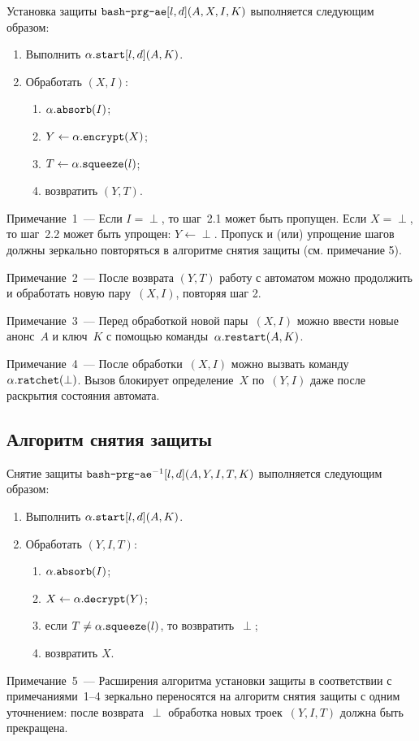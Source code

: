 Установка защиты $\texttt{bash-prg-ae}[l,d](A,X,I,K)$ выполняется следующим образом:
\begin{enumerate}
\item
Выполнить $\alpha.\texttt{start}[l,d](A,K)$.
\item
Обработать $(X,I)$:
\begin{enumerate}
\item
$\alpha.\texttt{absorb}(I)$;
\item
$Y\leftarrow\alpha.\texttt{encrypt}(X)$;
\item
$T\leftarrow \alpha.\texttt{squeeze}(l)$;
\item
возвратить $(Y,T)$.
\end{enumerate}
\end{enumerate}

\begin{note}
Примечание~1~--- 
Если $I=\perp$, то шаг~2.1 может быть пропущен.
%
Если $X=\perp$, то шаг~2.2 может быть упрощен: $Y\leftarrow\perp$.
%
Пропуск и (или) упрощение шагов должны зеркально повторяться в алгоритме снятия 
защиты (см. примечание 5).
\end{note}

\begin{note}
Примечание~2~--- После возврата $(Y,T)$ работу с автоматом
можно продолжить и обработать новую пару~$(X,I)$, повторяя шаг 2.
\end{note}

\begin{note}
Примечание~3~--- Перед обработкой новой пары~$(X,I)$ можно ввести
новые анонс~$A$ и ключ~$K$ с помощью 
команды~$\alpha.\texttt{restart}(A, K)$.
\end{note}

\begin{note}
Примечание~4~--- 
После обработки~$(X,I)$ можно вызвать 
команду~$\alpha.\texttt{ratchet}(\perp)$. Вызов блокирует  
определение~$X$ по~$(Y,I)$ даже после раскрытия состояния автомата. 
\end{note}

\subsection{Алгоритм снятия защиты}\label{PRG.AE.Unwrap}

Снятие защиты $\texttt{bash-prg-ae}^{-1}[l,d](A,Y,I,T,K)$ выполняется 
следующим образом:
\begin{enumerate}
\item
Выполнить $\alpha.\texttt{start}[l,d](A,K)$.
\item
Обработать $(Y,I,T)$:
\begin{enumerate}
\item
$\alpha.\texttt{absorb}(I)$;
\item
$X\leftarrow\alpha.\texttt{decrypt}(Y)$;
\item
если $T\neq\alpha.\texttt{squeeze}(l)$, то возвратить~$\perp$;
\item
возвратить $X$.
\end{enumerate}
\end{enumerate}

\begin{note}
Примечание~5~--- Расширения алгоритма установки защиты в соответствии 
с примечаниями~1--4 зеркально переносятся на алгоритм снятия защиты
с одним уточнением: после возврата~$\perp$ обработка новых троек~$(Y,I,T)$
должна быть прекращена.
\end{note}
